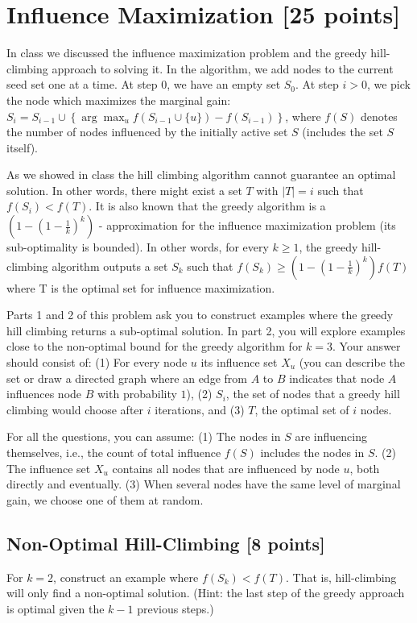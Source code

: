 
\section{Influence Maximization [25 points]}

In class we discussed the influence maximization problem and the greedy hill-climbing approach to solving it. In the algorithm, we add nodes to the current seed set one at a time. At step 0, we have an empty set $S_0$. At step $i > 0$, we pick the node which maximizes the marginal gain: $S_i = S_{i-1} \cup \left\{ \arg \max_u f(S_{i-1} \cup \{u\})-f(S_{i-1})\right\}$, where $f(S)$ denotes the number of nodes influenced by the initially active set $S$ (includes the set $S$ itself).

As we showed in  class the hill climbing algorithm cannot guarantee an optimal solution. In other words, there might exist a set $T$ with $|T| = i$ such that $f(S_i) < f(T)$. It is also known that the greedy algorithm is a $(1-(1-\frac{1}{k})^k)$ - approximation for the influence maximization problem (its sub-optimality is bounded). In other words, for every $k \geq 1$, the greedy hill-climbing algorithm outputs a set $S_k$ such that $f(S_k) \geq (1-(1-\frac{1}{k})^k) f(T)$ where T is the optimal set for influence maximization.  

Parts 1 and 2 of this problem ask you to construct examples where the greedy hill climbing returns a sub-optimal solution. In part 2, you will explore examples close to the non-optimal bound for the greedy algorithm for $k=3$. Your answer should consist of: (1) For every node $u$ its influence set $X_u$ (you can describe the set or draw a directed graph where an edge from $A$ to $B$ indicates that node $A$ influences node $B$ with probability $1$),
(2) $S_i$, the set of nodes that a greedy hill climbing would choose after $i$ iterations, and (3) $T$, the optimal set of $i$ nodes.



For all the questions, you can assume: (1) The nodes in $S$ are influencing themselves, i.e., the count of total influence $f(S)$ includes the nodes in $S$. (2) The influence set $X_{u}$ contains all nodes that are influenced by node $u$, both directly and eventually. (3) When several nodes have the same level of marginal gain, we choose one of them at random.\\

\subsection{Non-Optimal Hill-Climbing [8 points]} For $k = 2$, construct an example where $f(S_k) < f(T)$. That is, hill-climbing will only find a non-optimal solution. (Hint: the last step of the greedy approach is optimal given the $k-1$ previous steps.)\\


